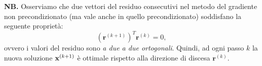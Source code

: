 \begin{itemize}
\begin{figure}[htpb]
\end{figure}
\FloatBarrier

\end{itemize}

\textbf{NB.}
Osserviamo che due vettori del residuo consecutivi nel metodo del gradiente non precondizionato (ma vale anche in quello precondizionato) soddisfano la seguente proprietà:
\begin{equation}
\left(\mathbf{r}^{( k+1)}\right)^{T}\mathbf{r}^{(k)} = 0,
\label{eq:prop-ortogonalita-gradiente}
\end{equation}
ovvero i valori del residuo sono \textit{a due a due ortogonali}. Quindi, ad ogni passo $k$ la nuova soluzione $\mathbf{x}^{( k+1)}$ è ottimale rispetto alla direzione di discesa $\mathbf{r}^{(k)}$.


